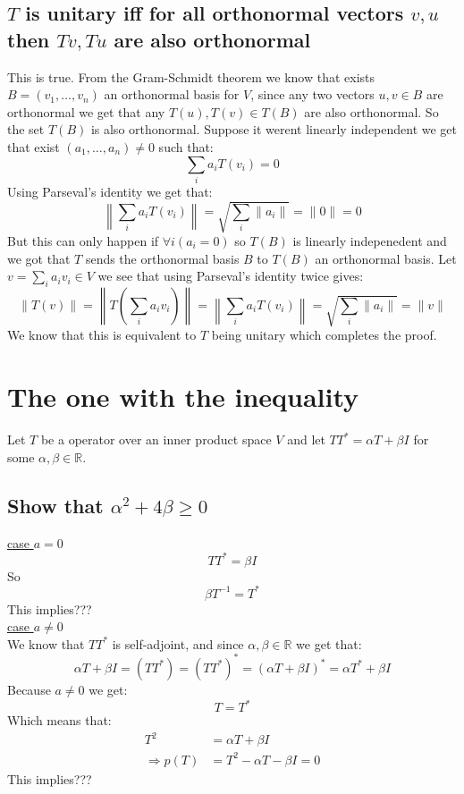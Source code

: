 \documentclass[11pt,a4paper]{article}
\theoremstyle{plain}
\newcommand{\R}{\mathbb{R}}
\begin{document}
	\newpage
	
	\subsection{$T$ is unitary iff for all orthonormal vectors $v,u$ then 
	$Tv,Tu$ are also orthonormal}
	This is true. From the Gram-Schmidt theorem we know that exists 
	$B=(v_1,\dots,v_n)$ an orthonormal basis for $V$, since any two vectors 
	$u,v\in B$ are orthonormal we get that any $T(u),T(v)\in T(B)$ are also 
	orthonormal. So the set $T(B)$ is also orthonormal. Suppose it werent 
	linearly independent we get that exist $(a_1,\dots,a_n)\neq 0$ such that:
	\[
		\sum_{i}{a_i T(v_i)} = 0
	\]
	Using Parseval's identity we get that:
	\[
		\left\|\sum_{i}{a_i T(v_i)}\right\| = 
		\sqrt{\sum_{i}{\|a_i\|}} = \|0\| = 0
	\]
	But this can only happen if $\forall i(a_i = 0)$ so $T(B)$ is linearly
	indepenedent and we got that $T$ sends the orthonormal basis $B$ to 
	$T(B)$ an orthonormal basis. Let $v=\sum_{i}{a_i v_i}\in V$ we see that 
	using Parseval's identity twice gives:
	\[
		\|T(v)\| = \left\|T\left(\sum_{i}{a_i v_i}\right)\right\| 
		= \left\|\sum_{i}{a_i T(v_i)}\right\| = 
		\sqrt{\sum_{i}{\|a_i\|}} = \|v\|
	\]
	We know that this is equivalent to $T$ being unitary which completes the
	proof.
	
	\newpage
	
	\section{The one with the inequality}
	Let $T$ be a operator over an inner product space $V$ and let 
	$TT^{*}=\alpha T + \beta I$ for some $\alpha,\beta\in\R$.
	\subsection{Show that $\alpha^2+4\beta \ge 0$}
	\underline{case $a=0$}
	\[
		TT^* = \beta I
	\]
	So \[ \beta T^{-1} = T^* \] This implies??? \\ 
	\underline{case $a \neq 0$} \\
	We know that $TT^*$ is self-adjoint, and since $\alpha,\beta\in\R$ 
	we get that:
	\[
		\alpha T + \beta I = (TT^*)
		= (TT^*)^* = (\alpha T + \beta I)^* = \alpha T^* + \beta I
	\]
	Because $a\neq 0$ we get:
	\[
		T = T^*
	\]
	Which means that:
	\begin{align*}
		T^2 &= \alpha T + \beta I \\ \Rightarrow 
		p(T) &= T^2 -  \alpha T - \beta I = 0
	\end{align*}
	This implies???
	
\end{document}
